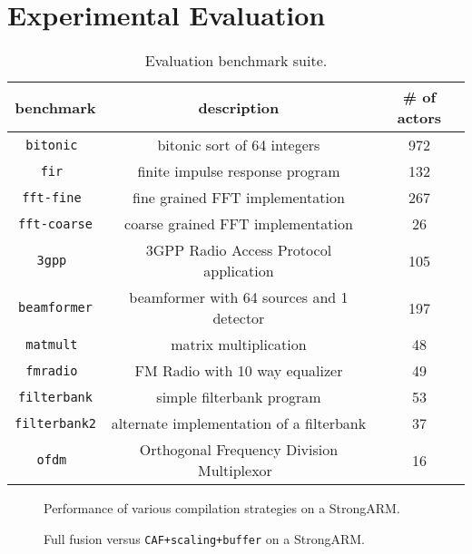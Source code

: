 \section{Experimental Evaluation}
\label{sec:evaluation}

\begin{table}[t]
\center
\label{tab:benchmarks}
\vspace{-12pt}
{\tiny
\begin{tabular}{|c|c|c|} \hline
{\bf benchmark}&{\bf description}&{\bf \# of actors}\\ \hline \hline
\texttt{bitonic	} &bitonic sort of 64 integers	&	972 \\ \hline
\texttt{fir	      } &finite impulse response program	&	132 \\ \hline
\texttt{fft-fine	} &fine grained FFT implementation	&	267 \\ \hline
\texttt{fft-coarse} &coarse grained FFT implementation	&	26 \\ \hline
\texttt{3gpp	} &3GPP Radio Access Protocol application	&	105 \\ \hline
\texttt{beamformer} &beamformer with 64 sources and 1 detector& 197 \\ \hline
\texttt{matmult	} &matrix multiplication	&	48 \\ \hline
\texttt{fmradio	} &FM Radio with 10 way equalizer	&	49 \\ \hline
\texttt{filterbank} &simple filterbank program	&	53 \\ \hline
\texttt{filterbank2}&alternate implementation of a filterbank &	37 \\ \hline
\texttt{ofdm	 }& Orthogonal Frequency Division Multiplexor~\cite{spectrumware}	&	16 \\ \hline
\end{tabular}
}
\vspace{-12pt}
\caption{Evaluation benchmark suite.}
\end{table}



\begin{figure*}
\begin{minipage}{3.4in}
\caption{Performance of various compilation strategies on a StrongARM.\protect\label{fig:arm-perf2}}
\end{minipage}
\hspace{0.1in}
\begin{minipage}{3.4in}
\caption{Full fusion versus \texttt{CAF+scaling+buffer} on a StrongARM.\protect\label{fig:arm-perf}}
\end{minipage}
\end{figure*}

